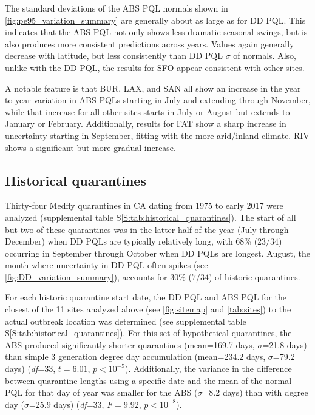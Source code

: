 \documentclass[10pt,a4paper,twocolumn]{article}
\begin{document}
The standard deviations of the ABS PQL normals 
shown in \autoref{fig:pe95_variation_summary}
are generally about  as large as for DD PQL.
This indicates that the ABS PQL not only shows less dramatic seasonal swings, 
but is also produces more consistent predictions across years.
Values again generally decrease with latitude, but less consistently than DD PQL $\sigma$ of normals.
Also, unlike with the DD PQL, the results for SFO appear consistent with other sites.

A notable feature is that BUR, LAX, and SAN all show an increase in the year to year variation
in ABS PQLs starting in July and extending through November, 
while that increase for all other sites starts in July or August 
but extends to January or February.
Additionally, results for FAT show a sharp increase in uncertainty starting in September, fitting with the 
more arid/inland climate.  RIV shows a significant but more gradual increase.

\subsection*{Historical quarantines}

Thirty-four Medfly quarantines in CA dating from 1975 to early 2017 were analyzed
(supplemental table S\ref{S:tab:historical_quarantines}).
The start of all but two of these quarantines was in the latter half of the year
(July through December) when DD PQLs are typically relatively long,
with 68\% ($23/34$) occurring in September through October when DD PQLs are
longest. 
August, the month where uncertainty in DD PQL often spikes 
(see \autoref{fig:DD_variation_summary}), 
accounts for 30\% ($7/34$) of historic quarantines.

For each historic quarantine start date, the DD PQL and ABS PQL 
for the closest of the 11 sites analyzed above (see \autoref{fig:sitemap} and \autoref{tab:sites}) 
to the actual outbreak location was determined
(see supplemental table S\ref{S:tab:historical_quarantines}).
For this set of hypothetical quarantines, 
the ABS produced significantly shorter quarantines
(mean=169.7 days, $\sigma$=21.8 days)
than simple 3 generation degree day accumulation
(mean=234.2 days, $\sigma$=79.2 days)
(\textit{df}=33, $t{=}6.01$, $p{<}10^{-5}$).
Additionally, the variance in the difference between quarantine lengths
using a specific date and the mean of the normal PQL for that day of year
was smaller for the ABS ($\sigma$=8.2 days)
than with degree day ($\sigma$=25.9 days)
(\textit{df}=33, $F{=}9.92$, $p{<}10^{-8}$).
\end{document}
